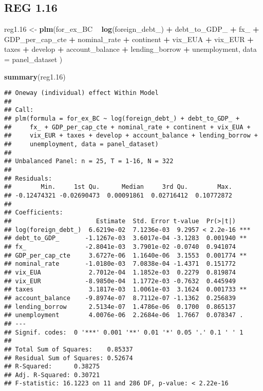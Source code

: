 \documentclass[]{article}
\newenvironment{Shaded}{\begin{snugshade}}{\end{snugshade}}
\newcommand{\KeywordTok}[1]{\textcolor[rgb]{0.13,0.29,0.53}{\textbf{#1}}}
\newcommand{\DataTypeTok}[1]{\textcolor[rgb]{0.13,0.29,0.53}{#1}}
\newcommand{\DecValTok}[1]{\textcolor[rgb]{0.00,0.00,0.81}{#1}}
\newcommand{\StringTok}[1]{\textcolor[rgb]{0.31,0.60,0.02}{#1}}
\newcommand{\OperatorTok}[1]{\textcolor[rgb]{0.81,0.36,0.00}{\textbf{#1}}}
\newcommand{\NormalTok}[1]{#1}
\begin{document}
\subsection{REG 1.16}\label{reg-1.16}

\begin{Shaded}
\begin{Highlighting}[]
\NormalTok{reg1.}\DecValTok{16}\NormalTok{ <-}\StringTok{ }\KeywordTok{plm}\NormalTok{(for_ex_BC }\OperatorTok{~}\StringTok{ }\KeywordTok{log}\NormalTok{(foreign_debt_) }\OperatorTok{+}\StringTok{ }\NormalTok{debt_to_GDP_ }\OperatorTok{+}\StringTok{ }\NormalTok{fx_ }\OperatorTok{+}\StringTok{ }\NormalTok{GDP_per_cap_cte }\OperatorTok{+}\StringTok{ }\NormalTok{nominal_rate }\OperatorTok{+}\StringTok{ }\NormalTok{continent }\OperatorTok{+}\StringTok{ }\NormalTok{vix_EUA }\OperatorTok{+}\StringTok{ }\NormalTok{vix_EUR }\OperatorTok{+}\StringTok{ }\NormalTok{taxes }\OperatorTok{+}\StringTok{ }\NormalTok{develop }\OperatorTok{+}\StringTok{ }\NormalTok{account_balance }\OperatorTok{+}\StringTok{ }\NormalTok{lending_borrow }\OperatorTok{+}\StringTok{ }\NormalTok{unemployment, }\DataTypeTok{data =}\NormalTok{ panel_dataset )}

\KeywordTok{summary}\NormalTok{(reg1.}\DecValTok{16}\NormalTok{)}
\end{Highlighting}
\end{Shaded}

\begin{verbatim}
## Oneway (individual) effect Within Model
## 
## Call:
## plm(formula = for_ex_BC ~ log(foreign_debt_) + debt_to_GDP_ + 
##     fx_ + GDP_per_cap_cte + nominal_rate + continent + vix_EUA + 
##     vix_EUR + taxes + develop + account_balance + lending_borrow + 
##     unemployment, data = panel_dataset)
## 
## Unbalanced Panel: n = 25, T = 1-16, N = 322
## 
## Residuals:
##        Min.     1st Qu.      Median     3rd Qu.        Max. 
## -0.12474321 -0.02690473  0.00091861  0.02716412  0.10772872 
## 
## Coefficients:
##                       Estimate  Std. Error t-value  Pr(>|t|)    
## log(foreign_debt_)  6.6219e-02  7.1236e-03  9.2957 < 2.2e-16 ***
## debt_to_GDP_       -1.1267e-03  3.6017e-04 -3.1283  0.001940 ** 
## fx_                -2.8041e-03  3.7901e-02 -0.0740  0.941074    
## GDP_per_cap_cte     3.6727e-06  1.1640e-06  3.1553  0.001774 ** 
## nominal_rate       -1.0180e-03  7.0838e-04 -1.4371  0.151772    
## vix_EUA             2.7012e-04  1.1852e-03  0.2279  0.819874    
## vix_EUR            -8.9850e-04  1.1772e-03 -0.7632  0.445949    
## taxes               3.1817e-03  1.0061e-03  3.1624  0.001733 ** 
## account_balance    -9.8974e-07  8.7112e-07 -1.1362  0.256839    
## lending_borrow      2.5134e-07  1.4786e-06  0.1700  0.865137    
## unemployment        4.0076e-06  2.2684e-06  1.7667  0.078347 .  
## ---
## Signif. codes:  0 '***' 0.001 '**' 0.01 '*' 0.05 '.' 0.1 ' ' 1
## 
## Total Sum of Squares:    0.85337
## Residual Sum of Squares: 0.52674
## R-Squared:      0.38275
## Adj. R-Squared: 0.30721
## F-statistic: 16.1223 on 11 and 286 DF, p-value: < 2.22e-16
\end{verbatim}
\end{document}
